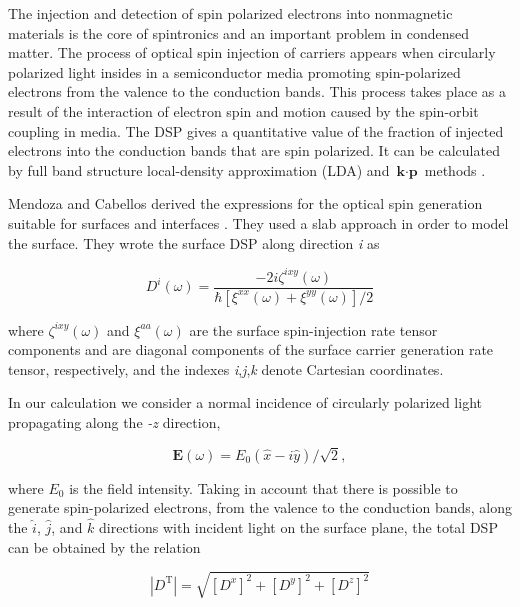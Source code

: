 \documentclass[twocolumn,aps,pra,11pt,tightenlines,showpacs,superscriptaddress,groupedaddress]{revtex4-1}
\begin{document}
The injection and detection of spin polarized electrons into nonmagnetic materials is the core of spintronics \cite{vzutic2004spintronics,fert2008nobel,pezzoli2012optical,bottegoni2013experimental,bottegoni2013photoinduced} and an important problem in condensed matter. The process of optical spin injection of carriers appears when circularly polarized light \cite{dyakonov1984theory} insides in a semiconductor media promoting spin-polarized electrons from the valence to the conduction bands. This process takes place as a result of the interaction of electron spin and motion caused by the spin-orbit coupling in media. The DSP gives a quantitative value of the fraction of injected electrons into the conduction bands that are spin polarized. It can be calculated by full band structure local-density approximation (LDA) and $\textbf{k}\cdot \textbf{p}$ methods \cite{nastos2007full,cabellos2009stress}.

Mendoza and Cabellos derived the expressions for the optical spin generation suitable for surfaces and interfaces \cite{mendoza2012optical}. They used a slab approach in order to model the surface. They wrote the surface DSP along direction \emph{i} as

\begin{equation}
    D^{i}(\omega) = \frac{-2i \zeta^{ixy} (\omega)}{\hbar \left[ \xi^{xx}(\omega) + \xi^{yy}(\omega) \right] /2 } \label{eq:D^i}
\end{equation}

\noindent where $\zeta^{ixy} (\omega)$ and $\xi^{aa}(\omega)$ are the surface spin-injection rate tensor components and are diagonal components of the surface carrier generation rate tensor, respectively, and the indexes \emph{i},\emph{j},\emph{k} denote Cartesian coordinates.

In our calculation we consider a normal incidence of circularly polarized light propagating along the \emph{-z} direction,

\begin{equation*}
    \mathbf{E} (\omega) = E_{0}(\hat{x} -i \hat{y})/\sqrt{2}, 
\end{equation*}


\noindent where $E_{0}$ is the field intensity. Taking in account that there is possible to generate spin-polarized electrons, from the valence to the conduction bands, along the $\hat{i}$, $\hat{j}$, and $\hat{k}$ directions with incident light on the surface plane, the total DSP can be obtained by the relation 

\begin{equation*}
    |{D^{\text{T}}}| = \sqrt{ \left[ D^{x} \right]^{2} + \left[ D^{y} \right]^{2} + \left[ D^{z} \right]^{2} }
\end{equation*}
\end{document}
